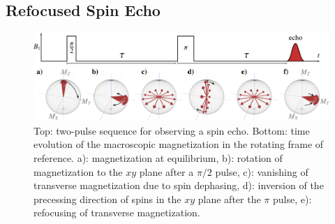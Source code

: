 \subsection{Refocused Spin Echo}
\label{subs:spin_echo}
\begin{figure}[H]
\center
	\includegraphics[width=1\textwidth]{./epr_basics/fse.pdf}
	\caption{Top: two-pulse sequence for observing a spin echo. Bottom: time evolution of the macroscopic magnetization in the rotating frame of reference. a): magnetization at equilibrium, b): rotation of magnetization to the $xy$ plane after a $\pi/2$ pulse, c): vanishing of transverse magnetization due to spin dephasing, d): inversion of the precessing direction of spins in the $xy$ plane after the $\pi$ pulse, e): refocusing of transverse magnetization.}
	\label{fig:spin_echo_diagram}
\end{figure}


